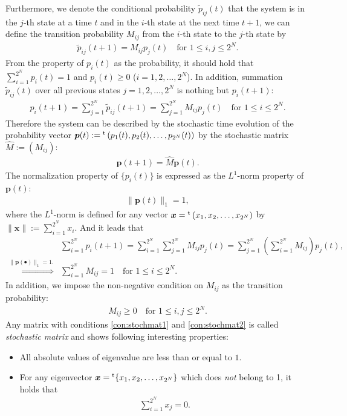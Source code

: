 Furthermore, we denote the conditional probability $\tilde{p}_{ij}(t)$ that the system is in the $j$-th state at a time $t$ and in the $i$-th state at the next time $t+1$, we can define the transition probability $M_{ij}$ from the $i$-th state to the $j$-th state by
\begin{align}
\tilde{p}_{ij}(t + 1) = M_{ij} p_{j}(t)\quad\text{for $1\leq i,j\leq 2^{N}$}.
\end{align}
From the property of $p_{i}(t)$ as the probability, it should hold that $\sum_{i=1}^{2^{N}}p_{i}(t)=1$ and $p_{i}(t) \ge 0$ ($i=1,2,\dots,2^{N}$). In addition, summation $\tilde{p}_{ij}(t)$ over all previous states $j=1,2,\dots,2^{N}$ is nothing but $p_{i}(t+1)$:
\begin{align}
p_{i}(t+1) = \sum_{j=1}^{2^{N}}\tilde{p}_{ij}(t + 1) = \sum_{j=1}^{2^{N}}M_{ij}p_{j}(t)\quad\text{for $1\leq i\leq 2^{N}$}.
\end{align}
Therefore the system can be described by the stochastic time evolution of the probability vector $\bm{p}(t):={}^{\rm t}\left(p_{1}(t),p_{2}(t),\dots,p_{2^{N}}(t)\right)$ by the stochastic matrix $\hat{M}:=\left(M_{ij}\right)$:
\begin{align}
\bm{p}(t + 1) = \hat{M}\bm{p}(t).
\end{align}
The normalization property of $\{p_{i}(t)\}$ is expressed as the $L^{1}$-norm property of $\bm{p}(t)$:
\begin{align}
\|\bm{p}(t)\|_{1} = 1,
\end{align}
where the $L^{1}$-norm is defined for any vector $\bm{x}={}^{\rm t}\left(x_{1},x_{2},\dots,x_{2^{N}}\right)$ by $\|\bm{x}\|:=\sum_{i=1}^{2^{N}}x_{i}$. And it leads that
\begin{align}
&\sum_{i=1}^{2^{N}}p_{i}(t + 1) = \sum_{i=1}^{2^{N}}\sum_{j=1}^{2^{N}}M_{ij}p_{j}(t) = \sum_{j=1}^{2^{N}} \left(\sum_{i=1}^{2^{N}}M_{ij}\right)p_{j}(t),\\
\overset{\|\bm{p}(\bullet)\|_{1} = 1.}{\Longleftrightarrow} &\sum_{i=1}^{2^{N}}M_{ij} = 1\quad\text{for $1\leq i\leq 2^{N}$}\label{con:stochmat1}.
\end{align}
In addition, we impose the non-negative condition on $M_{ij}$ as the transition probability:
\begin{align}
M_{ij}\ge 0\quad\text{for $1\leq i,j\leq 2^{N}$}\label{con:stochmat2}.
\end{align}
Any matrix with conditions \eqref{con:stochmat1} and \eqref{con:stochmat2} is called \textit{stochastic matrix} and shows following interesting properties:
\begin{itemize}
	\item All absolute values of eigenvalue are less than or equal to $1$.
	\item For any eigenvector $\bm{x}={}^{\rm t}\{x_{1},x_{2},\dots,x_{2^{N}}\}$ which does \textit{not} belong to 1, it holds that
	\begin{align}
		\sum_{i=1}^{2^{N}}x_{j}=0.
	\end{align}
\end{itemize}
